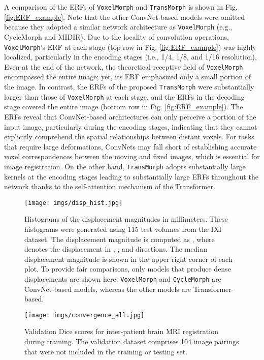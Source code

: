 \documentclass[times,twocolumn,final]{elsarticle}
\begin{document}
A comparison of the ERFs of \texttt{VoxelMorph} and \texttt{TransMorph} is shown in Fig. \ref{fig:ERF_example}. Note that the other ConvNet-based models were omitted because they adopted a similar network architecture as \texttt{VoxelMorph} (e.g., CycleMorph and MIDIR). Due to the locality of convolution operations, \texttt{VoxelMorph}'s ERF at each stage (top row in Fig. \ref{fig:ERF_example}) was highly localized, particularly in the encoding stages (i.e., 1/4, 1/8, and 1/16 resolution). Even at the end of the network, the theoretical receptive field of \texttt{VoxelMorph} encompassed the entire image; yet, its ERF emphasized only a small portion of the image. In contrast, the ERFs of the proposed \texttt{TransMorph} were substantially larger than those of \texttt{VoxelMorph} at each stage, and the ERFs in the decoding stage covered the entire image (bottom row in Fig. \ref{fig:ERF_example}). The ERFs reveal that ConvNet-based architectures can only perceive a portion of the input image, particularly during the encoding stages, indicating that they cannot explicitly comprehend the spatial relationships between distant voxels. For tasks that require large deformations, ConvNets may fall short of establishing accurate voxel correspondences between the moving and fixed images, which is essential for image registration. On the other hand, \texttt{TransMorph} adopts substantially large kernels at the encoding stages leading to substantially large ERFs throughout the network thanks to the self-attention mechanism of the Transformer.

\begin{figure*}[!h]
\centering
\texttt{[image: imgs/disp\_hist.jpg]}
\caption{Histograms of the displacement magnitudes in millimeters. These histograms were generated using 115 test volumes from the IXI dataset. The displacement magnitude is computed as , where  denotes the displacement in , , and  directions. The median displacement magnitude is shown in the upper right corner of each plot. To provide fair comparisons, only models that produce dense displacements are shown here. \texttt{VoxelMorph} and \texttt{CycleMorph} are ConvNet-based models, whereas the other models are Transformer-based. \label{fig:disp_hist}}
\end{figure*}

\begin{figure*}[!h]
\centering
\texttt{[image: imgs/convergence\_all.jpg]}
\caption{Validation Dice scores for inter-patient brain MRI registration during training. The validation dataset comprises 104 image pairings that were not included in the training or testing set.\label{fig:convergence}}
\end{figure*}
\end{document}
